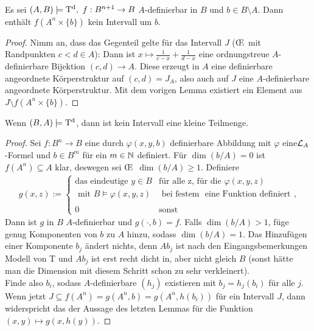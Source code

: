 \begin{corollary}
	Es sei $(A,B)\models\td,\ f:B^{n+1}\rightarrow B$ $A$-definierbar in $B$ und $b\in B\setminus A$. Dann enthält $f(A^n\times\{b\})$ kein Intervall um $b$.
\end{corollary}
\begin{proof}
	Nimm an, dass das Gegenteil gelte für das Intervall $J$ (\OE\ mit Randpunkten $c<d\in A$): Dann ist $x\mapsto\frac{1}{c-x}+\frac{1}{d-x}$ eine ordnungstreue $A$-definierbare Bijektion $(c,d)\rightarrow A$. Diese erzeugt in $A$ eine definierbare angeordnete Körperstruktur auf $(c,d)=J_A$, also auch auf $J$ eine $A$-definierbare angeordnete Körperstruktur. Mit dem vorigen Lemma existiert ein Element aus $J\setminus f(A^n\times\{b\})$.
\end{proof}

\begin{theorem}\label{Kleinheit}
	Wenn $(B,A)\models\operatorname{T^d}$, dann ist kein Intervall eine kleine Teilmenge.
\end{theorem}
\begin{proof}
	Sei $f:B^n\rightarrow B$ eine durch $\varphi(x,y,b)$ definierbare Abbildung mit $\varphi$ eine\linebreak$\mathcal{L}_A$-Formel und $b\in B^m$ für ein $m\in\mathbb{N}$ definiert. Für $\dim(b/A)=0$ ist $f(A^n)\subseteq A$ klar, deswegen sei \OE\ $\dim(b/A)\geq1$. Definiere
	\begin{align*}
	g(x,z):=\left\{\begin{array}{ll}
	\text{das eindeutige }y\in B &\text{für alle z, für die }\varphi(x,y,z)\\
	\text{ mit }B\models\varphi(x,y,z) &\text{ bei festem }\text{ eine Funktion definiert}\\
	\ &\ \\
	0 &\text{sonst}
	\end{array}\right.,
	\end{align*}
	Dann ist $g$ in $B$ $A$-definierbar und $g(\cdot,b)=f$. Falls $\dim(b/A)>1$, füge genug Komponenten von $b$ zu $A$ hinzu, sodass $\dim(b/A)=1$. Das Hinzufügen einer Komponente $b_j$ ändert nichts, denn $Ab_j$ ist nach den Eingangsbemerkungen Modell von T und $Ab_j$ ist erst recht dicht in, aber nicht gleich $B$ (sonst hätte man die Dimension mit diesem Schritt schon zu sehr verkleinert).\\
	Finde also $b_i$, sodass $A$-definierbare $(h_j)$ existieren mit $b_j=h_j(b_i)$ für alle $j$. Wenn jetzt $J\subseteq f(A^n)=g(A^n,b)=g(A^n,h(b_i))$ für ein Intervall $J$, dann widerspricht das der Aussage des letzten Lemmas für die Funktion $(x,y)\mapsto g(x,h(y))$.
\end{proof}

